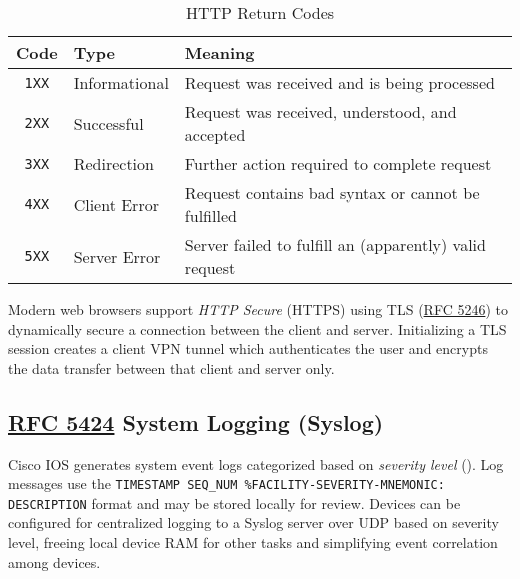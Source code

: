 \documentclass[12pt]{article}
\newcommand{\RFC}[1]{\href{https://datatracker.ietf.org/doc/html/rfc#1}{RFC #1}}
\begin{document}
	\begin{table}[H]
	\centering
	\caption{HTTP Return Codes \label{tab:HTTP CODES}}
	\begin{tabular}{@{} c l l @{}}\hline
	\textbf{Code}	& \textbf{Type}	& \textbf{Meaning}\\\hline
	\texttt{1XX}		& Informational	& Request was received and is being processed\\
	\texttt{2XX}		& Successful	& Request was received, understood, and accepted\\
	\texttt{3XX}		& Redirection	& Further action required to complete request\\
	\texttt{4XX}		& Client Error	& Request contains bad syntax or cannot be fulfilled\\
	\texttt{5XX}		& Server Error	& Server failed to fulfill an (apparently) valid request\\\hline
	\end{tabular}\end{table}
	Modern web browsers support \textit{HTTP Secure} (HTTPS) using TLS (\RFC{5246}) to dynamically secure a connection between the client and server. Initializing a TLS session creates a client VPN tunnel which authenticates the user and encrypts the data transfer between that client and server only.


	\subsection[RFC 5424 Syslog]{\RFC{5424} System Logging (Syslog) \label{subsec:SYSLOG}}
	Cisco IOS generates system event logs categorized based on \textit{severity level} (). Log messages use the \texttt{TIMESTAMP SEQ\_NUM \%FACILITY-SEVERITY-MNEMONIC: DESCRIPTION} format and may be stored locally for review. Devices can be configured for centralized logging to a Syslog server over UDP based on severity level, freeing local device RAM for other tasks and simplifying event correlation among devices.
\end{document}
